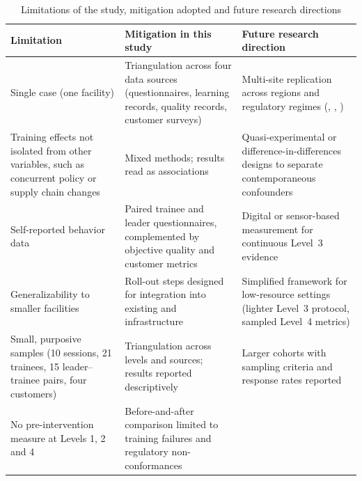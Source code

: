 \begin{table}[H]
  \centering
  \caption{Limitations of the study, mitigation adopted and future research directions}
  \label{tab:limitations}
  \footnotesize
  \begin{tabularx}{\linewidth}{@{}>{\raggedright\arraybackslash}p{3.6cm} >{\raggedright\arraybackslash}X >{\raggedright\arraybackslash}X@{}}
    \toprule
    \textbf{Limitation} & \textbf{Mitigation in this study} & \textbf{Future research direction} \\
    \midrule
    Single case (one \MRO{} facility) &
    Triangulation across four data sources (questionnaires, learning records, quality records, customer surveys) &
    Multi-site replication across regions and regulatory regimes (\FAA{}, \EASA{}, \ANAC{}) \\
    \addlinespace
    Training effects not isolated from other variables, such as concurrent policy or supply chain changes &
    Mixed methods; results read as associations &
    Quasi-experimental or difference-in-differences designs to separate contemporaneous confounders \parencite{FernandezDelgado2024,Patel2023} \\
    \addlinespace
    Self-reported behavior data &
    Paired trainee and leader questionnaires, complemented by objective quality and customer metrics &
    Digital or sensor-based measurement for continuous Level~3 evidence \parencite{Garcia2024} \\
    \addlinespace
    Generalizability to smaller \MRO{} facilities &
    Roll-out steps designed for integration into existing \LMS{} and \ERP{} infrastructure &
    Simplified framework for low-resource settings (lighter Level~3 protocol, sampled Level~4 metrics) \\
    \addlinespace
    Small, purposive samples (10 sessions, 21 trainees, 15 leader--trainee pairs, four customers) &
    Triangulation across levels and sources; results reported descriptively &
    Larger cohorts with sampling criteria and response rates reported \\
    \addlinespace
    No pre-intervention measure at Levels 1, 2 and 4 &
    Before-and-after comparison limited to training failures and regulatory non-conformances &

\end{tabularx}
\end{table}
